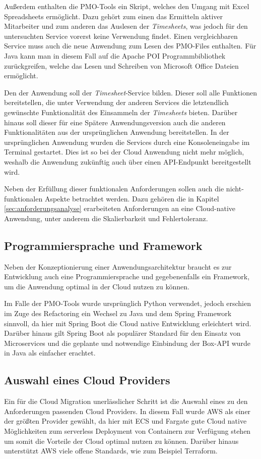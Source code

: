 Außerdem enthalten die PMO-Tools ein Skript, welches den Umgang mit Excel Spreadsheets ermöglicht. Dazu gehört zum einen das Ermitteln aktiver Mitarbeiter und zum anderen das Auslesen der \textit{\glspl{Timesheet}}, was jedoch für den untersuchten Service vorerst keine Verwendung findet. Einen vergleichbaren Service muss auch die neue Anwendung zum Lesen des PMO-Files enthalten. Für Java kann man in diesem Fall auf die Apache POI Programmbibliothek zurückgreifen, welche das Lesen und Schreiben von Microsoft Office Dateien ermöglicht.

Den \grqq{} der Anwendung soll der \textit{\gls{Timesheet}}-Service bilden. Dieser soll alle Funktionen bereitstellen, die unter Verwendung der anderen Services die letztendlich gewünschte Funktionalität des Einsammeln der \textit{\glspl{Timesheet}} bieten. Darüber hinaus soll dieser für eine Spätere Anwendungsversion auch die anderen Funktionalitäten aus der ursprünglichen Anwendung bereitstellen. In der ursprünglichen Anwendung wurden die Services durch eine Konsoleneingabe im Terminal gestartet. Dies ist so bei der Cloud Anwendung nicht mehr möglich, weshalb die Anwendung zukünftig auch über einen \ac{API}-Endpunkt bereitgestellt wird.

Neben der Erfüllung dieser funktionalen Anforderungen sollen auch die nicht-funktionalen Aspekte betrachtet werden. Dazu gehören die in Kapitel \ref{sec:anforderungsanalyse} erarbeiteten Anforderungen an eine Cloud-native Anwendung, unter anderem die Skalierbarkeit und Fehlertoleranz. \pagebreak

\subsection{Programmiersprache und Framework}
Neben der Konzeptionierung einer Anwendungsarchitektur braucht es zur Entwicklung auch eine Programmiersprache und gegebenenfalls ein Framework, um die Anwendung optimal in der Cloud nutzen zu können. 

Im Falle der PMO-Tools wurde ursprünglich Python verwendet, jedoch erschien im Zuge des Refactoring ein Wechsel zu Java und dem \gls{Spring} Framework sinnvoll, da hier mit \gls{Spring Boot} die Cloud native Entwicklung erleichtert wird. Darüber hinaus gilt \gls{Spring Boot} als populärer Standard für den Einsatz von Microservices und die geplante und notwendige Einbindung der \gls{Box}-API wurde in Java als einfacher erachtet.

\subsection{Auswahl eines Cloud Providers}
Ein für die Cloud Migration unerlässlicher Schritt ist die Auswahl eines zu den Anforderungen passenden Cloud Providers. In diesem Fall wurde \ac{AWS} als einer der größten Provider \cite[Vgl.][S. 6]{Sustar2022} gewählt, da hier mit \ac{ECS} und Fargate gute Cloud native Möglichkeiten zum serverless Deployment von Containern zur Verfügung stehen um somit die Vorteile der Cloud optimal nutzen zu können. Darüber hinaus unterstützt \ac{AWS} viele offene Standards, wie zum Beispiel Terraform.

